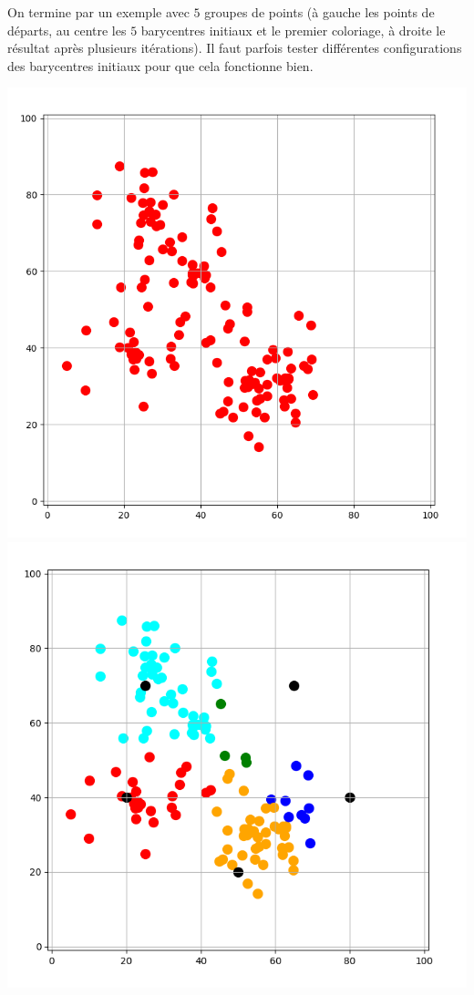 \documentclass[10pt,class=report,crop=false]{standalone}
\begin{document}
\begin{activite}[Barycentres]
On termine par un exemple avec $5$ groupes de points (à gauche les points de départs, au centre les $5$ barycentres initiaux et le premier coloriage, à droite le résultat après plusieurs itérations). Il faut parfois tester différentes configurations des barycentres initiaux pour que cela fonctionne bien.
	\begin{center}
	\includegraphics[scale=\myscale,scale=0.21]{ecran_barycentres_exemple_bis_01}\quad
	\includegraphics[scale=\myscale,scale=0.22]{ecran_barycentres_exemple_bis_02}\quad

\end{center}
\end{activite}
\end{document}
